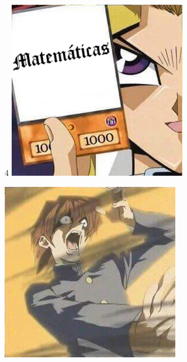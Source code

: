 \documentclass[10pt]{beamer} %
\begin{document}
\begin{frame}
\begin{center}4
    \includegraphics[width=.67\linewidth]{kaiba3.png}
\end{center}
\end{frame}
\begin{frame}
\begin{center}
    \includegraphics[width=.67\linewidth]{kaiba4.png}
\end{center}
\end{frame}
\end{document}
